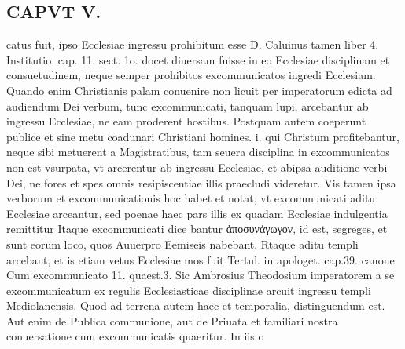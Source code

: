 \documentclass{article}
\begin{document}
\begin{pages}
\section*{CAPVT  V. }\pstart catus fuit, ipso Ecclesiae ingressu prohibitum esse D. Caluinus tamen liber  4. Institutio. cap. 11. sect. 1o. docet diuersam fuisse in eo Ecclesiae disciplinam et consuetudinem, neque semper prohibitos excommunicatos ingredi Ecclesiam. Quando enim Christianis palam conuenire non licuit per imperatorum edicta ad audiendum Dei verbum, tunc excommunicati, tanquam lupi, arcebantur ab ingressu Ecclesiae, ne eam proderent hostibus. Postquam autem coeperunt publice et sine metu coadunari Christiani homines. i. qui Christum profitebantur, neque sibi metuerent a Magistratibus, tam seuera disciplina in excommunicatos non est vsurpata, vt arcerentur ab ingressu Ecclesiae, et abipsa auditione verbi Dei, ne fores et spes omnis resipiscentiae illis praecludi videretur. Vis tamen ipsa verborum et excommunicationis hoc habet et notat, vt excommunicati aditu Ecclesiae arceantur, sed poenae haec pars illis ex quadam Ecclesiae indulgentia remittitur Itaque excommunicati dice bantur ἀποσυνάγωγον, id est, segreges, et sunt eorum loco, quos Auuerpro Eemiseis nabebant. Rtaque aditu templi arcebant, et is etiam vetus Ecclesiae mos fuit Tertul. in apologet. cap.39. canone Cum excommunicato 11. quaest.3. Sic Ambrosius Theodosium imperatorem a se excommunicatum ex regulis Ecclesiasticae disciplinae arcuit ingressu templi Mediolanensis.  \pend\pstart Quod ad terrena autem haec et temporalia, distinguendum est. Aut enim de Publica communione, aut de Priuata et familiari nostra conuersatione cum excommunicatis quaeritur. In iis o\pend

\end{pages}
\end{document}
